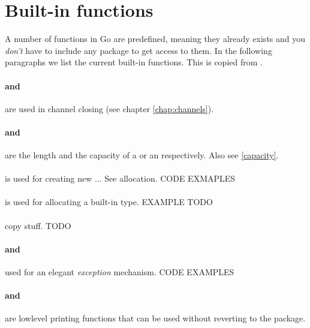\section{Built-in functions}
A number of functions in Go are predefined, meaning they already
exists and you \emph{don't} have to include any package to get
access to them. In the following paragraphs we list the current 
built-in functions. This is copied from \cite{go_spec}.

\paragraph{ and } are used in
channel closing (see chapter \ref{chap:channels}).

\paragraph{ and } are the length and the capacity
of a  or an  respectively. Also see
\ref{capacity}.

\paragraph{} is used for creating new ... See allocation. CODE
EXMAPLES

\paragraph{} is used for allocating a built-in type. EXAMPLE
TODO

\paragraph{} copy stuff. TODO

\paragraph{ and } used for an elegant \emph{exception} mechanism.
CODE EXAMPLES

\paragraph{ and } are lowlevel printing
functions that can be used without reverting to the  package.

